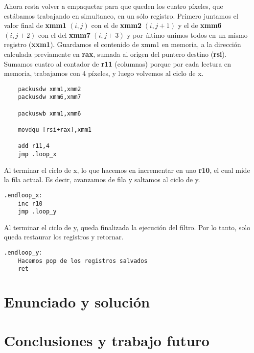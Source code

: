 \documentclass[a4paper]{article}
\begin{document}
\indent Ahora resta volver a empaquetar para que queden los cuatro p\'ixeles, que est\'abamos trabajando en simultaneo, en un s\'olo registro. Primero juntamos el valor final de \textbf{xmm1} $(i,j)$ con el de \textbf{xmm2} $(i,j+1)$ y el de \textbf{xmm6} $(i,j+2)$ con el del \textbf{xmm7} $(i,j+3)$ y por \'ultimo unimos todos en un mismo registro (\textbf{xxm1}). Guardamos el contenido de xmm1 en memoria, a la direcci\'on calculada previamente en \textbf{rax}, sumada al origen del puntero destino (\textbf{rsi}). Sumamos cuatro al contador de \textbf{r11} (columnas) porque por cada lectura en memoria, trabajamos con 4 p\'ixeles, y  luego volvemos al ciclo de x.
 \begin{codesnippet}
\begin{verbatim}
    packusdw xmm1,xmm2
    packusdw xmm6,xmm7

    packuswb xmm1,xmm6

    movdqu [rsi+rax],xmm1   

    add r11,4
    jmp .loop_x
\end{verbatim}
\end{codesnippet}

\indent Al terminar el ciclo de x, lo que hacemos en incrementar en uno \textbf{r10}, el cual mide la fila actual. Es decir, avanzamos de fila y saltamos al ciclo de y.
\begin{codesnippet}
\begin{verbatim}
.endloop_x:
    inc r10
    jmp .loop_y
\end{verbatim}
\end{codesnippet}

\indent Al terminar el ciclo de y, queda finalizada la ejecuci\'on del filtro. Por lo tanto, solo queda restaurar los registros y retornar.
\begin{codesnippet}
\begin{verbatim}
.endloop_y:
    Hacemos pop de los registros salvados
    ret
\end{verbatim}
\end{codesnippet}
\newpage
\section{Enunciado y soluci\'on} 



\section{Conclusiones y trabajo futuro}
\end{document}

